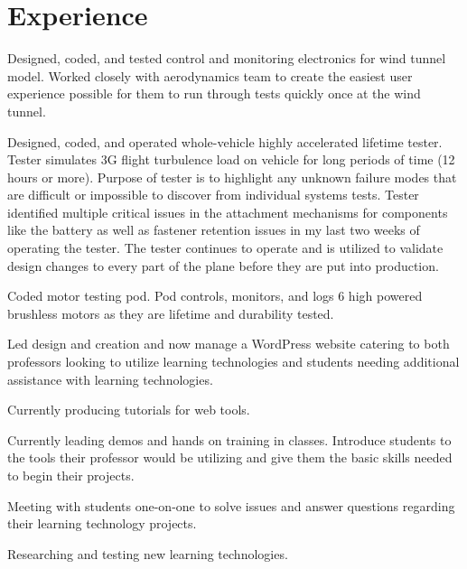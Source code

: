 \documentclass[]{deedy-resume-openfont}
\begin{document}
\hfill
\begin{minipage}[t]{0.66\textwidth} 


\section{Experience}

\vspace{\topsep} %
\vspace{\topsep}
\begin{tightemize}
\item Designed, coded, and tested control and monitoring electronics for wind tunnel model. Worked closely with aerodynamics team to create the easiest user experience possible for them to run through tests quickly once at the wind tunnel.
\item Designed, coded, and operated whole-vehicle highly accelerated lifetime tester. Tester simulates 3G flight turbulence load on vehicle for long periods of time (12 hours or more). Purpose of tester is to highlight any unknown failure modes that are difficult or impossible to discover from individual systems tests. Tester identified multiple critical issues in the attachment mechanisms for components like the battery as well as fastener retention issues in my last two weeks of operating the tester. The tester continues to operate and is utilized to validate design changes to every part of the plane before they are put into production.
\item Coded motor testing pod. Pod controls, monitors, and logs 6 high powered brushless motors as they are lifetime and durability tested.
\end{tightemize}
\sectionsep

\vspace{\topsep} %
\begin{tightemize}
\item Led design and creation and now manage a WordPress website catering to both professors looking to utilize learning technologies and students needing additional assistance with learning technologies.
\item Currently producing tutorials for web tools.
\item Currently leading demos and hands on training in classes. Introduce students to the tools their professor would be utilizing and give them the basic skills needed to begin their projects.
\item Meeting with students one-on-one to solve issues and answer questions regarding their learning technology projects.
\item Researching and testing new learning technologies.
\end{tightemize}
\sectionsep


\end{minipage}
\end{document}
